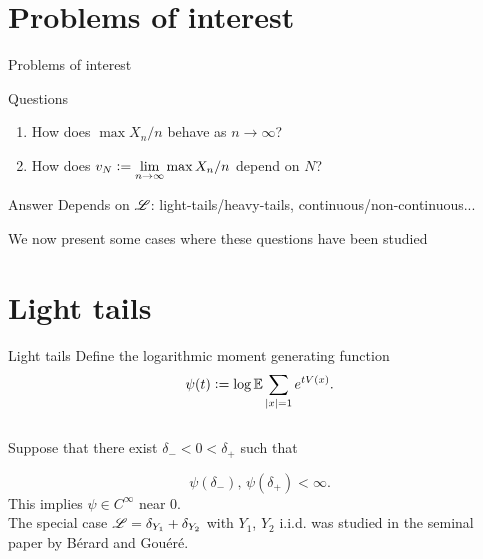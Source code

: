\documentclass{beamer}
\begin{document}
\section{Problems of interest}
\begin{frame}{Problems of interest}
\begin{block}{Questions}
\begin{enumerate}[1]
	\item How does $\max X_n / n$ behave as $n \to \infty$?
	\item How does $v_N \vcentcolon= \lim\limits_{n \to \infty}\max X_n / n$ depend on $N$?
\end{enumerate}
\end{block}

\begin{block}{Answer}
Depends on $\mathscr{L}$: light-tails/heavy-tails, continuous/non-continuous...
\end{block}
\vspace{5mm}
We now present some cases where these questions have been studied 
\end{frame}















\section{Light tails}
\begin{frame}{Light tails}
Define the logarithmic moment generating function
\begin{equation}\nonumber
\psi(t) \vcentcolon= \log \mathbb{E} \sum\limits_{|x| = 1} e^{t V(x)}. 
\end{equation} \\

Suppose that there exist $\delta_- < 0 < \delta_+$ such that 

\begin{equation}\nonumber
\psi(\delta_-),\, \psi(\delta_+) < \infty. 
\end{equation}
This implies $\psi \in C^\infty$ near $0$. \\
\vspace{5mm}
The special case $\mathscr{L} = \delta_{Y_1} + \delta_{Y_2}$ with $Y_1$, $Y_2$ i.i.d. was studied in the seminal paper \cite{exp_tails} by Bérard and Gouéré. 
\end{frame}
\end{document}
